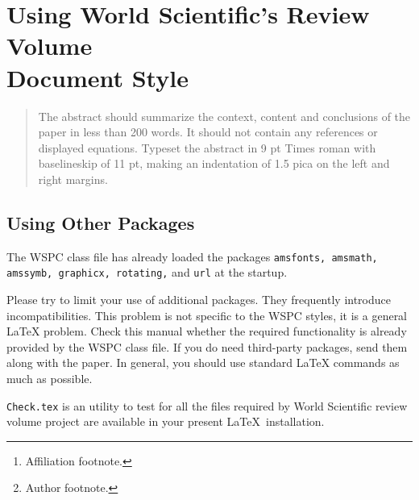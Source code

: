 \documentclass{ws-rv961x669}
\begin{document}
\chapter[Using World Scientific's Review Volume Document Style]{Using World Scientific's Review Volume\\ Document Style\label{ra_ch1}}

\author[F. Author and S. Author]{First Author and Second Author\footnote{Author footnote.}}

\address{World Scientific Publishing Co, Production Department,\\
5 Toh Tuck Link, Singapore 596224, \\
f\_author@wspc.com.sg\footnote{Affiliation footnote.}}

\begin{abstract}
The abstract should summarize the context, content and conclusions of
the paper in less than 200 words. It should not contain any references
or displayed equations. Typeset the abstract in 9 pt Times roman with
baselineskip of 11 pt, making an indentation of 1.5 pica on the left
and right margins.
\end{abstract}


\body


\section{Using Other Packages}\label{ra_sec1}
The WSPC class file has already loaded the packages
\verb|amsfonts, amsmath,| \verb|amssymb, graphicx, rotating,| and \verb|url|
at the startup.

Please try to limit your use of additional packages. They
frequently introduce incompatibilities. This problem is not
specific to the WSPC styles, it is a general \LaTeX{} problem.
Check this manual whether the required functionality is already
provided by the WSPC class file. If you do need third-party
packages, send them along with the paper. In general, you should
use standard \LaTeX{} commands as much as possible.

\verb|Check.tex| is an utility to test for
all the files required by World Scientific review volume project
are available in your present \LaTeX\ installation.
\end{document}
